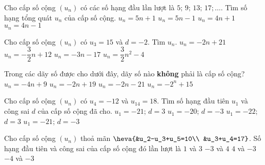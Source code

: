 \begin{ex}%
	Cho cấp số cộng $(u_n )$ có các số hạng đầu lần lượt là $5;\,9;\,13;\,17;\ldots $. Tìm số hạng tổng quát $u_n$ của cấp số cộng.
	\choice
	{$u_n=5n+1$}
	{$u_n=5n-1$}
	{\True $u_n=4n+1$}
	{$u_n=4n-1$}
\end{ex}

\begin{ex}%
	Cho cấp số cộng $(u_n)$ có $u_3=15$ và $d=-2$. Tìm $u_n$.
	\choice
	{\True $u_n=-2n+21$}
	{$u_n=-\dfrac{3}{2}n+12$}
	{$u_n=-3n-17$}
	{$u_n=\dfrac{3}{2}{{n}^2}-4$}
\end{ex}

\begin{ex}%
	Trong các dãy số được cho dưới đây, dãy số nào {\bf không} phải là cấp số cộng?
	\choice
	{$u_n=-4n+9$}
	{$u_n=-2n+19$}
	{$u_n=-2n-21$}
	{\True $u_n=-2^n+15$}
\end{ex}

\begin{ex}%
	Cho cấp số cộng $(u_n)$ có $u_4=-12$ và $u_{14}=18$. Tìm số hạng đầu tiên $u_1$ và công sai $d$ của cấp số cộng đã cho.
	\choice
	{\True $u_1=-21$; $d=3$}
	{$u_1=-20$; $d=-3$}
	{$u_1=-22$; $d=3$}
	{$u_1=-21$; $d=-3$}
\end{ex}

\begin{ex}%
	Cho cấp số cộng $(u_n)$ thoả mãn $\heva{&u_2-u_3+u_5=10\\ &u_3+u_4=17}$. Số hạng đầu tiên và công sai của cấp số cộng đó lần lượt là
	\choice
	{\True $1$ và $3$}
	{$-3$ và $4$}
	{$4$ và $-3$}
	{$-4$ và $-3$}
\end{ex}

